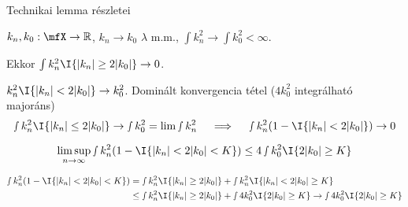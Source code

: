 \documentclass[aspectratio=169,notheorems,9pt,\option]{beamer}
\begin{document}
\begin{frame}{Technikai lemma részletei} 
  \begin{proposition}
    $k_n,k_0:\mfX\to\real$,
    $k_n\to k_0$ $\lambda$ m.m., 
    $\int k_n^2\to\int k_0^2<\infty$.
    
    Ekkor $\int k^2_n\I{\abs{k_n}\geq 2\abs{k_0}}\to0$.
  \end{proposition}
  \continue
  $k^2_n\I{\abs{k_n}< 2\abs{k_0}}\to k_0^2$. Dominált konvergencia tétel ($4k_0^2$ integrálható majoráns)
    \begin{displaymath}
      \smallint k^2_n\I{\abs{k_n}\leq 2\abs{k_0}} \to\smallint k_0^2=\lim\smallint k_n^2 
      \quad\implies\quad 
      \smallint k_n^2(1-\I{\abs{k_n}<2\abs{k_0}})\to0 
    \end{displaymath}
  \pause
  \begin{corollary}
    \begin{displaymath}
      \limsup_{n\to\infty} \smallint k^2_n(1-\I{\abs{k_n}<2\abs{k_0}<K}) \leq 4\smallint k_0^2\I{2\abs{k_0}\geq K}
    \end{displaymath}
  \end{corollary}
  \begin{align*}
    \smallint k^2_n(1-\I{\abs{k_n}<2\abs{k_0}<K})
    &= \smallint k_n^2\I{\abs{k_n}\geq 2\abs{k_0}}+\smallint k_n^2\I{\abs{k_n}<2\abs{k_0}\geq K}\\
    &\leq \smallint k_n^2\I{\abs{k_n}\geq 2\abs{k_0}}+\smallint 4k_0^2\I{2\abs{k_0}\geq K}
    \to \smallint 4 k_0^2\I{2\abs{k_0}\geq K}
  \end{align*}
\end{frame}
\end{document}
